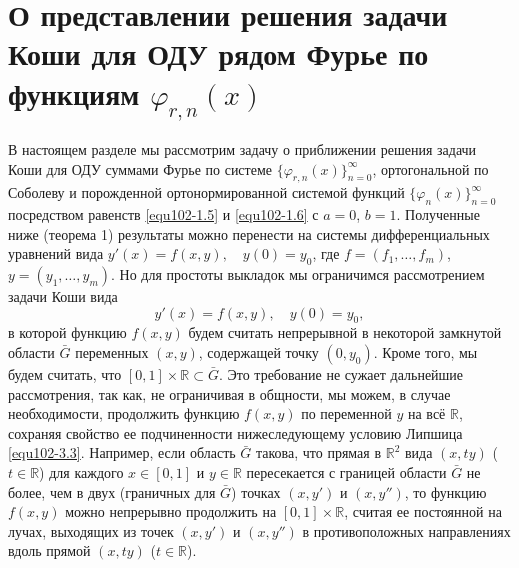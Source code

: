 \section{О представлении решения задачи Коши для ОДУ рядом Фурье по функциям $\varphi_{r,n}(x)$}
В настоящем разделе мы рассмотрим задачу о приближении решения задачи Коши для ОДУ  суммами  Фурье по системе $\{\varphi_{r,n}(x)\}_{n=0}^\infty$, ортогональной по Соболеву и порожденной ортонормированной системой функций $\{\varphi_{n}(x)\}_{n=0}^\infty$ посредством равенств \eqref{equ102-1.5} и \eqref{equ102-1.6} с $a=0$, $b=1$.
 Полученные ниже (теорема 1) результаты можно перенести на системы дифференциальных уравнений вида
$y'(x)=f(x,y), \quad y(0)=y_0$, где $f=(f_1, \ldots, f_m)$, $y=(y_1, \ldots, y_m)$. Но для простоты выкладок мы ограничимся рассмотрением задачи Коши вида
\begin{equation}\label{equ102-3.1}
y'(x)=f(x,y), \quad y(0)=y_0,
\end{equation}
 в которой функцию   $f(x,y)$  будем считать непрерывной в некоторой замкнутой  области $\bar G$ переменных $(x,y)$, содержащей точку $(0,y_0)$. Кроме того, мы будем  считать, что  $[0,1]\times\mathbb{R}\subset\bar G$. Это требование не сужает дальнейшие рассмотрения, так как, не ограничивая в общности,  мы можем, в случае необходимости, продолжить функцию $f(x,y)$ по переменной $y$ на всё $\mathbb{R}$, сохраняя свойство ее подчиненности  нижеследующему условию Липшица \eqref{equ102-3.3}. Например, если область $\bar G$ такова, что  прямая в $\mathbb{R}^{2}$ вида $(x,ty)$ ($t\in\mathbb{R}$) для каждого $x\in[0,1]$ и $y\in\mathbb{R}$ пересекается с границей области $\bar G$ не более, чем в двух (граничных для $\bar G$) точках $(x,y')$ и $(x,y'')$, то функцию $f(x,y)$ можно непрерывно продолжить   на $[0,1]\times\mathbb{R}$, считая ее  постоянной на лучах, выходящих из точек  $(x,y')$ и $(x,y'')$ в противоположных направлениях вдоль прямой $(x,ty)$ ($t\in\mathbb{R}$).

